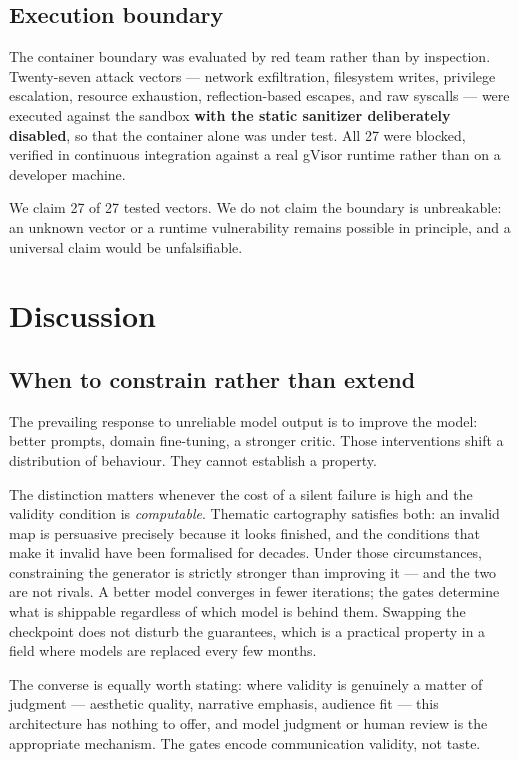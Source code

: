 \subsection{Execution boundary}
The container boundary was evaluated by red team rather than by inspection. Twenty-seven attack vectors --- network exfiltration, filesystem writes, privilege escalation, resource exhaustion, reflection-based escapes, and raw syscalls --- were executed against the sandbox \textbf{with the static sanitizer deliberately disabled}, so that the container alone was under test. All 27 were blocked, verified in continuous integration against a real gVisor runtime rather than on a developer machine.

We claim 27 of 27 tested vectors. We do not claim the boundary is unbreakable: an unknown vector or a runtime vulnerability remains possible in principle, and a universal claim would be unfalsifiable.

\section{Discussion}
\subsection{When to constrain rather than extend}
The prevailing response to unreliable model output is to improve the model: better prompts, domain fine-tuning, a stronger critic. Those interventions shift a distribution of behaviour. They cannot establish a property.

The distinction matters whenever the cost of a silent failure is high and the validity condition is \emph{computable}. Thematic cartography satisfies both: an invalid map is persuasive precisely because it looks finished, and the conditions that make it invalid have been formalised for decades. Under those circumstances, constraining the generator is strictly stronger than improving it --- and the two are not rivals. A better model converges in fewer iterations; the gates determine what is shippable regardless of which model is behind them. Swapping the checkpoint does not disturb the guarantees, which is a practical property in a field where models are replaced every few months.

The converse is equally worth stating: where validity is genuinely a matter of judgment --- aesthetic quality, narrative emphasis, audience fit --- this architecture has nothing to offer, and model judgment or human review is the appropriate mechanism. The gates encode communication validity, not taste.


